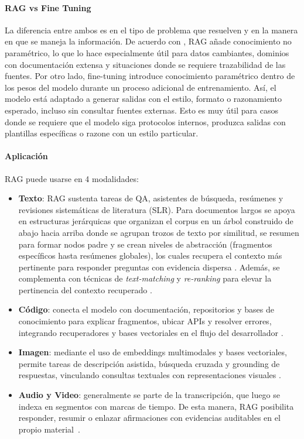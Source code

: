 \paragraph{RAG vs Fine Tuning}  
La diferencia entre ambos es en el tipo de problema que resuelven y en la manera en que se maneja la información.
 De acuerdo con \textcite{gao2023rag}, RAG añade conocimiento no paramétrico, lo que lo hace especialmente útil para datos cambiantes,
  dominios con documentación extensa y situaciones donde se requiere trazabilidad de las fuentes. Por otro lado, fine-tuning introduce conocimiento 
  paramétrico dentro de los pesos del modelo durante un proceso adicional de entrenamiento. Así, el modelo está adaptado a generar salidas con el estilo, formato o razonamiento esperado, incluso sin consultar fuentes externas. Esto es muy útil para casos donde se requiere que el modelo siga protocolos internos, produzca salidas con plantillas específicas o razone con un estilo particular.

\paragraph{Aplicación}  
RAG puede usarse en 4 modalidades:

\begin{itemize}
    \item \textbf{Texto}: RAG sustenta tareas de QA, asistentes de búsqueda, resúmenes y revisiones sistemáticas de literatura (SLR). 
    Para documentos largos se apoya en estructuras jerárquicas que organizan el corpus en un árbol construido de abajo hacia arriba donde 
    se agrupan trozos de texto por similitud, se resumen para formar nodos padre y se crean niveles de abstracción (fragmentos específicos hasta resúmenes globales), los cuales recupera el contexto más pertinente para responder preguntas con evidencia dispersa
     \parencite{sarthi2024raptor}. Además, se complementa con técnicas de \textit{text-matching} y \textit{re-ranking} para elevar la pertinencia del contexto recuperado \parencite{jiang2024textmatching}.
    
    \item \textbf{Código}: conecta el modelo con documentación, repositorios y bases de conocimiento para explicar fragmentos, ubicar APIs y resolver errores, integrando 
    recuperadores y bases vectoriales en el flujo del desarrollador \parencite{hu2024ragrau}.  
    
    \item \textbf{Imagen}: mediante el uso de embeddings multimodales y bases vectoriales, permite tareas de descripción asistida, búsqueda cruzada y grounding de respuestas,
     vinculando consultas textuales con representaciones visuales \parencite{jing2024vecdb,ma2025vector}.  
    
    \item \textbf{Audio y Video}: generalmente se parte de la transcripción, que luego se indexa en segmentos con marcas de tiempo. De esta manera, RAG posibilita responder,
     resumir o enlazar afirmaciones con evidencias auditables en el propio material~\parencite{jing2024vecdb,zhao2024rag}.  
\end{itemize}





